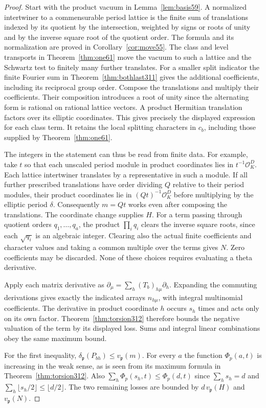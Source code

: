 \documentclass[a4paper,11pt]{article}
\theoremstyle{definition}
\theoremstyle{remark}
\numberwithin{equation}{section}
\newcommand{\OO}{\mathcal O}
\begin{document}
\begin{proof}
Start with the product vacuum in Lemma~\ref{lem:basis59}. A normalized
intertwiner to a commensurable period lattice is the finite sum of
translations indexed by its quotient by the intersection, weighted
by signs or roots of unity and by the inverse square root of the
quotient order. The formula and its normalization are proved in
Corollary~\ref{cor:move55}. The class and level transports in
Theorem~\ref{thm:one61} move the vacuum to such a lattice and the
Schwartz test to finitely many further translates. For a smaller
split indicator the finite Fourier sum in
Theorem~\ref{thm:bothlast311} gives the additional coefficients,
including its reciprocal group order. Compose the translations
and multiply their coefficients. Their composition introduces a
root of unity since the alternating form is rational on rational
lattice vectors. A product Hermitian translation factors over its
elliptic coordinates. This gives precisely the displayed expression
for each class term. It retains the local splitting characters in
\(c_b\), including those supplied by Theorem~\ref{thm:one61}.

The integers in the statement can thus be read from finite data.
For example, take \(t\) so that each unscaled period module in
product coordinates lies in \(t^{-1}\OO_K^D\). Each lattice
intertwiner translates by a representative in such a module.
If all further prescribed translations have order dividing \(Q\)
relative to their period modules, their product coordinates
lie in \((Qt)^{-1}\OO_K^D\) before multiplying by the elliptic
period \(\delta\). Consequently \(m=Qt\) works even after
composing the translations. The coordinate change supplies \(H\).
For a term passing through quotient orders \(q_1,\ldots,q_a\),
the product \(\prod_i q_i\) clears the inverse square roots, since
each \(\sqrt{q_i}\) is an algebraic integer. Clearing also the
actual finite coefficients and character values and taking a common
multiple over the terms gives \(N\). Zero coefficients may be
discarded. None of these choices requires evaluating a theta
derivative.

Apply each matrix derivative as
\(\partial_\mu=\sum_h(T_b)_{h\mu}\partial_h\).
Expanding the commuting derivations gives exactly the indicated
arrays \(n_{h\mu}\), with integral multinomial coefficients.
The derivative in product coordinate \(h\) occurs \(s_h\) times
and acts only on its own factor. Theorem~\ref{thm:torsion312}
therefore bounds the negative valuation of the term by its
displayed loss. Sums and integral linear combinations obey the
same maximum bound.

For the first inequality, \(\delta_{\mathfrak p}(P_{bh})\le
v_{\mathfrak p}(m)\). For every \(a\) the function
\(\Phi_p(a,t)\) is increasing in the weak sense, as is seen
from its maximum formula in Theorem~\ref{thm:torsion312}.
Also \(\sum_h\Phi_p(s_h,t)\le\Phi_p(d,t)\) since
\(\sum_hs_h=d\) and
\(\sum_h\lfloor s_h/2\rfloor\le\lfloor d/2\rfloor\).
The two remaining losses are bounded by
\(d\,v_{\mathfrak p}(H)\) and \(v_{\mathfrak p}(N)\).
\end{proof}
\end{document}
